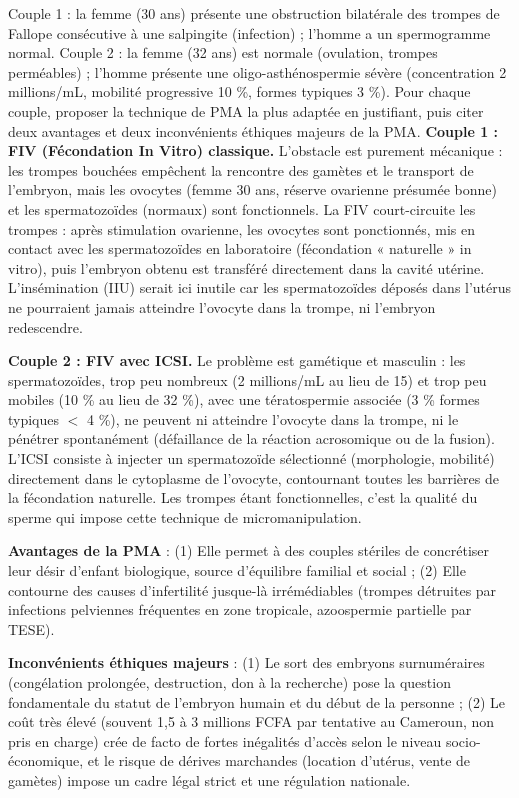 \documentclass[11pt]{article}
\begin{document}
\begin{exoresolu}
Couple 1 : la femme (30 ans) présente une obstruction bilatérale des trompes de Fallope consécutive à une salpingite (infection) ; l'homme a un spermogramme normal. Couple 2 : la femme (32 ans) est normale (ovulation, trompes perméables) ; l'homme présente une oligo-asthénospermie sévère (concentration 2 millions/mL, mobilité progressive 10 \%, formes typiques 3 \%). Pour chaque couple, proposer la technique de PMA la plus adaptée en justifiant, puis citer deux avantages et deux inconvénients éthiques majeurs de la PMA.
\tcblower
\textbf{Couple 1 : FIV (Fécondation In Vitro) classique.} L'obstacle est purement mécanique : les trompes bouchées empêchent la rencontre des gamètes et le transport de l'embryon, mais les ovocytes (femme 30 ans, réserve ovarienne présumée bonne) et les spermatozoïdes (normaux) sont fonctionnels. La FIV court-circuite les trompes : après stimulation ovarienne, les ovocytes sont ponctionnés, mis en contact avec les spermatozoïdes en laboratoire (fécondation « naturelle » in vitro), puis l'embryon obtenu est transféré directement dans la cavité utérine. L'insémination (IIU) serait ici inutile car les spermatozoïdes déposés dans l'utérus ne pourraient jamais atteindre l'ovocyte dans la trompe, ni l'embryon redescendre.

\textbf{Couple 2 : FIV avec ICSI.} Le problème est gamétique et masculin : les spermatozoïdes, trop peu nombreux (2 millions/mL au lieu de 15) et trop peu mobiles (10 \% au lieu de 32 \%), avec une tératospermie associée (3 \% formes typiques $<$ 4 \%), ne peuvent ni atteindre l'ovocyte dans la trompe, ni le pénétrer spontanément (défaillance de la réaction acrosomique ou de la fusion). L'ICSI consiste à injecter un spermatozoïde sélectionné (morphologie, mobilité) directement dans le cytoplasme de l'ovocyte, contournant toutes les barrières de la fécondation naturelle. Les trompes étant fonctionnelles, c'est la qualité du sperme qui impose cette technique de micromanipulation.

\textbf{Avantages de la PMA} : (1) Elle permet à des couples stériles de concrétiser leur désir d'enfant biologique, source d'équilibre familial et social ; (2) Elle contourne des causes d'infertilité jusque-là irrémédiables (trompes détruites par infections pelviennes fréquentes en zone tropicale, azoospermie partielle par TESE).

\textbf{Inconvénients éthiques majeurs} : (1) Le sort des embryons surnuméraires (congélation prolongée, destruction, don à la recherche) pose la question fondamentale du statut de l'embryon humain et du début de la personne ; (2) Le coût très élevé (souvent 1,5 à 3 millions FCFA par tentative au Cameroun, non pris en charge) crée de facto de fortes inégalités d'accès selon le niveau socio-économique, et le risque de dérives marchandes (location d'utérus, vente de gamètes) impose un cadre légal strict et une régulation nationale.


\end{exoresolu}
\end{document}
